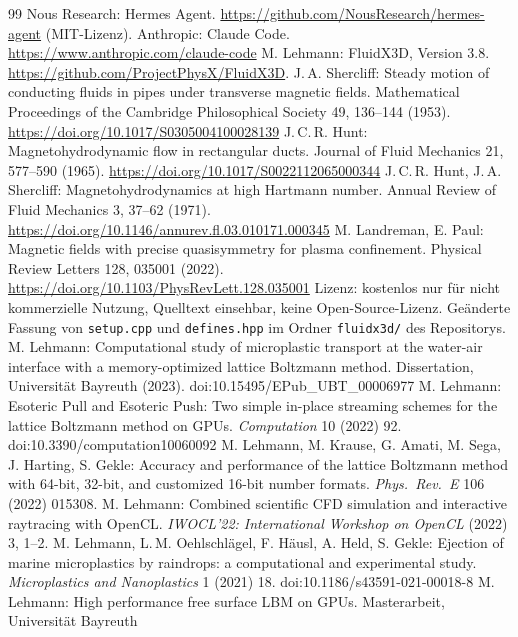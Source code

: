\documentclass[10pt,a4paper]{article}
\begin{document}
\begin{thebibliography}{99}
 Nous Research: Hermes Agent. \url{https://github.com/NousResearch/hermes-agent} (MIT-Lizenz).
 Anthropic: Claude Code. \url{https://www.anthropic.com/claude-code}
 M. Lehmann: FluidX3D, Version 3.8. \url{https://github.com/ProjectPhysX/FluidX3D}.
 J.\,A. Shercliff: Steady motion of conducting fluids in pipes under transverse magnetic fields. Mathematical Proceedings of the Cambridge Philosophical Society 49, 136--144 (1953). \url{https://doi.org/10.1017/S0305004100028139}
 J.\,C.\,R. Hunt: Magnetohydrodynamic flow in rectangular ducts. Journal of Fluid Mechanics 21, 577--590 (1965). \url{https://doi.org/10.1017/S0022112065000344}
 J.\,C.\,R. Hunt, J.\,A. Shercliff: Magnetohydrodynamics at high Hartmann number. Annual Review of Fluid Mechanics 3, 37--62 (1971). \url{https://doi.org/10.1146/annurev.fl.03.010171.000345}
 M. Landreman, E. Paul: Magnetic fields with precise quasisymmetry for plasma confinement. Physical Review Letters 128, 035001 (2022). \url{https://doi.org/10.1103/PhysRevLett.128.035001}
  Lizenz: kostenlos nur für nicht kommerzielle Nutzung, Quelltext einsehbar, keine Open-Source-Lizenz.
  Geänderte Fassung von \texttt{setup.cpp} und \texttt{defines.hpp} im Ordner \texttt{fluidx3d/} des Repositorys.
 M. Lehmann: Computational study of microplastic transport at the water-air interface with
  a memory-optimized lattice Boltzmann method. Dissertation, Universität Bayreuth (2023).
  doi:10.15495/EPub\_UBT\_00006977
 M. Lehmann: Esoteric Pull and Esoteric Push: Two simple in-place streaming schemes for
  the lattice Boltzmann method on GPUs. \emph{Computation} 10 (2022) 92. doi:10.3390/computation10060092
 M. Lehmann, M. Krause, G. Amati, M. Sega, J. Harting, S. Gekle: Accuracy and
  performance of the lattice Boltzmann method with 64-bit, 32-bit, and customized 16-bit number formats.
  \emph{Phys.\ Rev.\ E} 106 (2022) 015308.
 M. Lehmann: Combined scientific CFD simulation and interactive raytracing with
  OpenCL. \emph{IWOCL'22: International Workshop on OpenCL} (2022) 3, 1--2.
 M. Lehmann, L.\,M. Oehlschlägel, F. Häusl, A. Held, S. Gekle: Ejection of marine
  microplastics by raindrops: a computational and experimental study. \emph{Microplastics and Nanoplastics} 1
  (2021) 18. doi:10.1186/s43591-021-00018-8
 M. Lehmann: High performance free surface LBM on GPUs. Masterarbeit, Universität Bayreuth

\end{thebibliography}
\end{document}
